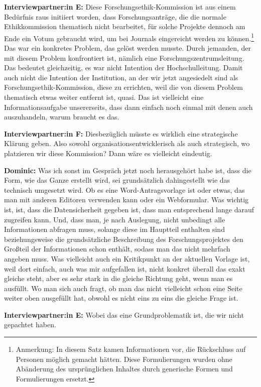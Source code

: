 \documentclass[a4paper,12pt,twoside]{scrreprt}
\begin{document}
\textbf{Interviewpartner:in E:} Diese Forschungsethik-Kommission ist aus einem Bedürfnis raus initiiert worden, dass Forschungsanträge, die die normale Ethikkommission thematisch nicht bearbeitet, für solche Projekte dennoch am Ende ein Votum gebraucht wird, um bei Journals eingereicht werden zu können.\footnote{Anmerkung: In diesem Satz kamen Informationen vor, die Rückschluss auf Personen möglich gemacht hätten. Diese Formulierungen wurden ohne Abänderung des ursprünglichen Inhaltes durch generische Formen und Formulierungen ersetzt.} Das war ein konkretes Problem, das gelöst werden musste. Durch jemanden, der mit diesem Problem konfrontiert ist, nämlich eine Forschungszentrumsleitung. Das bedeutet gleichzeitig, es war nicht Intention der Hochschulleitung. Damit auch nicht die Intention der Institution, an der wir jetzt angesiedelt sind als Forschungsethik-Kommission, diese zu errichten, weil die von diesem Problem thematisch etwas weiter entfernt ist, quasi. Das ist vielleicht eine Informationsaufgabe unsererseits, dass dann einfach noch einmal mit denen auch auszuhandeln, warum braucht es das.

\textbf{Interviewpartner:in F:} Diesbezüglich müsste es wirklich eine strategische Klärung geben. Also sowohl organisationsentwicklerisch als auch strategisch, wo platzieren wir diese Kommission? Dann wäre es vielleicht eindeutig.

\textbf{Dominic:} Was ich sonst im Gespräch jetzt noch herausgehört habe ist, dass die Form, wie das Ganze erstellt wird, sei grundsätzlich dahingestellt wie das technisch umgesetzt wird. Ob es eine Word-Antragsvorlage ist oder etwas, das man mit anderen Editoren verwenden kann oder ein Webformular. Was wichtig ist, ist, dass die Datensicherheit gegeben ist, dass man entsprechend lange darauf zugreifen kann. Und, dass man, je nach Auslegung, nicht unbedingt alle Informationen abfragen muss, solange diese im Hauptteil enthalten sind beziehungsweise die grundsätzliche Beschreibung des Forschungsprojektes den Großteil der Informationen schon enthält, sodass man das nicht mehrfach angeben muss. Was vielleicht auch ein Kritikpunkt an der aktuellen Vorlage ist, weil dort einfach, auch was mir aufgefallen ist, nicht konkret überall das exakt gleiche steht, aber es sehr stark in die gleiche Richtung geht, wenn man es ausfüllt. Wo man sich auch fragt, ob man das nicht vielleicht schon eine Seite weiter oben ausgefüllt hat, obwohl es nicht eins zu eins die gleiche Frage ist.

\textbf{Interviewpartner:in E:} Wobei das eine Grundproblematik ist, die wir nicht gepachtet haben.
\end{document}
